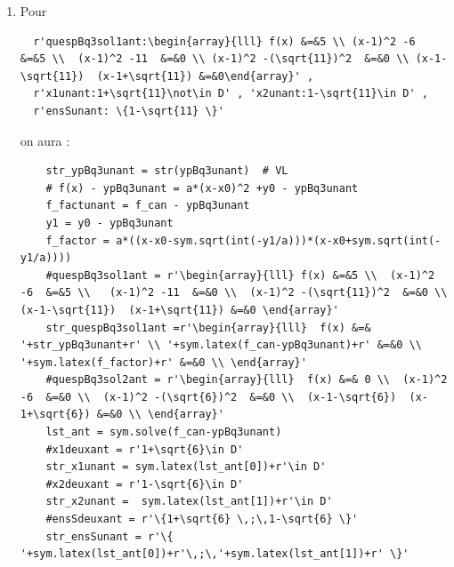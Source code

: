 {\begin{enumerate}
\begin{verbatim}
valeurs par defaut --> x1deuxant:1+\sqrt{6}\in D
      votre valeur --> x1deuxant:1 - \sqrt{6}\in D

valeurs par defaut --> x2deuxant:1-\sqrt{6}\in D
      votre valeur --> x2deuxant:1 + \sqrt{6}\in D

valeurs par defaut --> ensSdeuxant:\{1+\sqrt{6} \,;\,1-\sqrt{6} \}
      votre valeur --> ensSdeuxant:\{ 1 - \sqrt{6}\,;\,1 + \sqrt{6} \}
\end{verbatim}

\item Pour
\begin{verbatim}
  r'quespBq3sol1ant:\begin{array}{lll} f(x) &=&5 \\ (x-1)^2 -6  &=&5 \\  (x-1)^2 -11  &=&0 \\ (x-1)^2 -(\sqrt{11})^2  &=&0 \\ (x-1-\sqrt{11})  (x-1+\sqrt{11}) &=&0\end{array}' ,
  r'x1unant:1+\sqrt{11}\not\in D' , 'x2unant:1-\sqrt{11}\in D' , 
  r'ensSunant: \{1-\sqrt{11} \}'  
\end{verbatim}
on aura : 
\begin{verbatim}
    str_ypBq3unant = str(ypBq3unant)  # VL
    # f(x) - ypBq3unant = a*(x-x0)^2 +y0 - ypBq3unant
    f_factunant = f_can - ypBq3unant
    y1 = y0 - ypBq3unant
    f_factor = a*((x-x0-sym.sqrt(int(-y1/a)))*(x-x0+sym.sqrt(int(-y1/a))))
    #quespBq3sol1ant = r'\begin{array}{lll} f(x) &=&5 \\  (x-1)^2 -6  &=&5 \\   (x-1)^2 -11  &=&0 \\  (x-1)^2 -(\sqrt{11})^2  &=&0 \\  (x-1-\sqrt{11})  (x-1+\sqrt{11}) &=&0 \end{array}'
    str_quespBq3sol1ant =r'\begin{array}{lll}  f(x) &=& '+str_ypBq3unant+r' \\ '+sym.latex(f_can-ypBq3unant)+r' &=&0 \\ '+sym.latex(f_factor)+r' &=&0 \\ \end{array}' 
    #quespBq3sol2ant = r'\begin{array}{lll}  f(x) &=& 0 \\  (x-1)^2 -6  &=&0 \\  (x-1)^2 -(\sqrt{6})^2  &=&0 \\  (x-1-\sqrt{6})  (x-1+\sqrt{6}) &=&0 \\ \end{array}'
    lst_ant = sym.solve(f_can-ypBq3unant)
    #x1deuxant = r'1+\sqrt{6}\in D' 
    str_x1unant = sym.latex(lst_ant[0])+r'\in D'
    #x2deuxant = r'1-\sqrt{6}\in D' 
    str_x2unant =  sym.latex(lst_ant[1])+r'\in D'
    #ensSdeuxant = r'\{1+\sqrt{6} \,;\,1-\sqrt{6} \}' 
    str_ensSunant = r'\{ '+sym.latex(lst_ant[0])+r'\,;\,'+sym.latex(lst_ant[1])+r' \}'


\end{verbatim}
\end{enumerate}}
